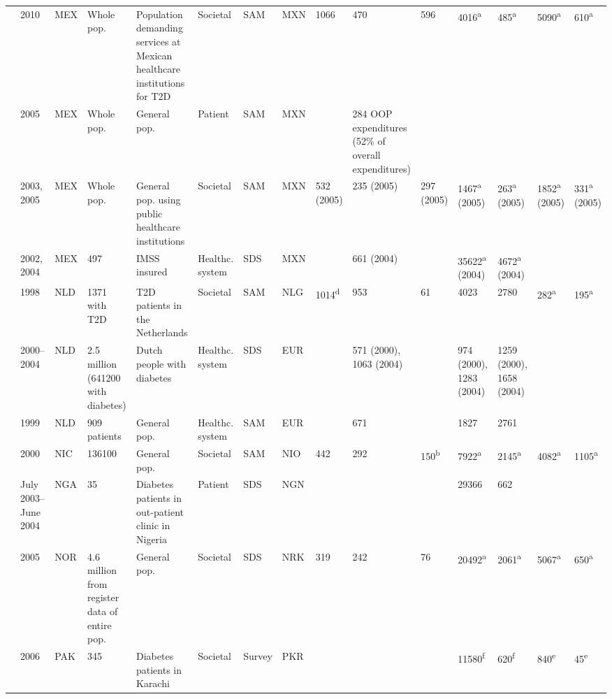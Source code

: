 \documentclass[12pt,english]{article}
\begin{document}
\begin{appendix}
\begin{landscape}
\begin{tabularx}{\linewidth}{Z X X Z Z X X X X X X X X Y Y}
\textcite{Arredondo2011b} & 2010 & MEX & Whole pop. & Population demanding services at Mexican   healthcare institutions for T2D & Societal & SAM & MXN & 1066 & 470 & 596 & 4016\textsuperscript{a} & 485\textsuperscript{a} & 5090\textsuperscript{a} & 610\textsuperscript{a} \\
\textcite{Arredondo2007} & 2005 & MEX & Whole pop. & General pop. & Patient & SAM & MXN &  & 284   \ac{OOP} expenditures (52\% of overall expenditures) &  &  &  &  &  \\
\textcite{Arredondo2004} & 2003, 2005 & MEX & Whole pop. & General pop. using public healthcare   institutions & Societal & SAM & MXN & 532 (2005) & 235 (2005) & 297 (2005) & 1467\textsuperscript{a}    (2005) & 263\textsuperscript{a}    (2005) & 1852\textsuperscript{a}    (2005) & 331\textsuperscript{a}    (2005) \\
\textcite{RodriguezBolanos2010a} & 2002, 2004 & MEX & 497 & IMSS insured & Healthc. system & SDS & MXN &  & 661 (2004) &  & 35622\textsuperscript{a}    (2004) & 4672\textsuperscript{a}    (2004) &  &  \\
\textcite{Redekop2002b} & 1998 & NLD & 1371 with T2D & T2D patients in the Netherlands & Societal & SAM & NLG & 1014\textsuperscript{d} & 953 & 61 & 4023 & 2780 & 282\textsuperscript{a} & 195\textsuperscript{a} \\
\textcite{VanderLinden2009c} & 2000--2004 & NLD & 2.5 million (641200 with diabetes) & Dutch people with diabetes & Healthc. system & SDS & EUR &  & 571 (2000), 1063 (2004) &  & 974 (2000), 1283 (2004) & 1259 (2000), 1658 (2004) &  &  \\
\textcite{Jonsson2002b} & 1999 & NLD & 909 patients & General pop. & Healthc. system & SAM & EUR &  & 671 &  & 1827 & 2761 &  &  \\
\textcite{Barcelo2003} & 2000 & NIC & 136100 & General pop. & Societal & SAM & NIO & 442 & 292 & 150\textsuperscript{b} & 7922\textsuperscript{a} & 2145\textsuperscript{a} & 4082\textsuperscript{a} & 1105\textsuperscript{a} \\
\textcite{Suleiman2006} & July 2003--June 2004 & NGA & 35 & Diabetes patients in out-patient clinic in   Nigeria & Patient & SDS & NGN &  &  &  & 29366 & 662 &  &  \\
\textcite{Solli2010a} & 2005 & NOR & 4.6 million from register data of entire   pop. & General pop. & Societal & SDS & NRK & 319 & 242 & 76 & 20492\textsuperscript{a} & 2061\textsuperscript{a} & 5067\textsuperscript{a} & 650\textsuperscript{a} \\
\textcite{Khowaja2007a} & 2006 & PAK & 345 & Diabetes patients in Karachi & Societal & Survey & PKR &  &  &  & 11580\textsuperscript{f} & 620\textsuperscript{f} & 840\textsuperscript{e} & 45\textsuperscript{e} \\

\end{tabularx}
\end{landscape}
\end{appendix}
\end{document}
